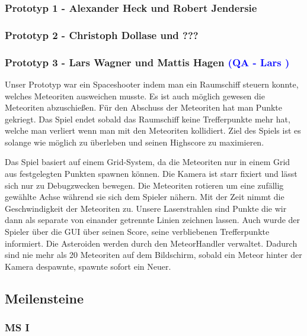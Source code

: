 \documentclass{article}
\begin{document}
\vspace{1cm}
\subsubsection{Prototyp 1 - Alexander Heck und Robert Jendersie}

\vspace{1cm}
\subsubsection{Prototyp 2 - Christoph Dollase und ???}

\vspace{1cm}
\subsubsection{Prototyp 3 - Lars Wagner und Mattis Hagen \textcolor{blue}{(QA - Lars )}}
Unser Prototyp war ein Spaceshooter indem man ein Raumschiff steuern konnte, welches Meteoriten ausweichen musste.
Es ist auch möglich gewesen die Meteoriten abzuschießen. Für den Abschuss der Meteoriten hat man Punkte gekriegt. Das Spiel endet sobald das Raumschiff keine Trefferpunkte mehr hat, welche man verliert wenn man mit den Meteoriten kollidiert. Ziel des Spiels ist es solange wie möglich zu überleben und seinen Highscore zu maximieren.

\noindent Das Spiel basiert auf einem Grid-System, da die Meteoriten nur in einem Grid aus festgelegten Punkten spawnen können. Die Kamera ist starr fixiert und lässt sich nur zu Debugzwecken bewegen. Die Meteoriten rotieren um eine zufällig gewählte Achse während sie sich dem Spieler nähern. Mit der Zeit nimmt die Geschwindigkeit der Meteoriten zu.
Unsere Laserstrahlen sind Punkte die wir dann als separate von einander getrennte Linien zeichnen lassen.
Auch wurde der Spieler über die GUI über seinen Score, seine verbliebenen Trefferpunkte informiert.
Die Asteroiden werden durch den MeteorHandler verwaltet. Dadurch sind nie mehr als 20 Meteoriten auf dem Bildschirm, sobald ein Meteor hinter der Kamera despawnte, spawnte sofort ein Neuer.

\vspace{2cm}
\subsection{Meilensteine}

\vspace{1cm}
\subsubsection{MS I}
\end{document}
